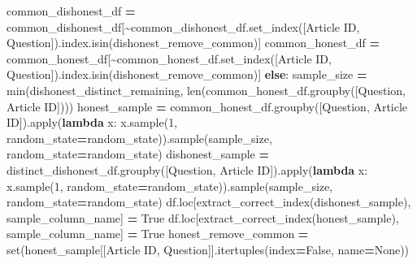 \documentclass[
]{article}
\newenvironment{Shaded}{\begin{snugshade}}{\end{snugshade}}
\newcommand{\BuiltInTok}[1]{#1}
\newcommand{\ControlFlowTok}[1]{\textcolor[rgb]{0.13,0.29,0.53}{\textbf{#1}}}
\newcommand{\DecValTok}[1]{\textcolor[rgb]{0.00,0.00,0.81}{#1}}
\newcommand{\KeywordTok}[1]{\textcolor[rgb]{0.13,0.29,0.53}{\textbf{#1}}}
\newcommand{\NormalTok}[1]{#1}
\newcommand{\OperatorTok}[1]{\textcolor[rgb]{0.81,0.36,0.00}{\textbf{#1}}}
\newcommand{\StringTok}[1]{\textcolor[rgb]{0.31,0.60,0.02}{#1}}
\newcommand{\VariableTok}[1]{\textcolor[rgb]{0.00,0.00,0.00}{#1}}
\begin{document}
\begin{Shaded}
\begin{Highlighting}[]
\NormalTok{        common\_dishonest\_df }\OperatorTok{=}\NormalTok{ common\_dishonest\_df[}\OperatorTok{\textasciitilde{}}\NormalTok{common\_dishonest\_df.set\_index([}\StringTok{\textquotesingle{}Article ID\textquotesingle{}}\NormalTok{, }\StringTok{\textquotesingle{}Question\textquotesingle{}}\NormalTok{]).index.isin(dishonest\_remove\_common)]}
\NormalTok{        common\_honest\_df }\OperatorTok{=}\NormalTok{ common\_honest\_df[}\OperatorTok{\textasciitilde{}}\NormalTok{common\_honest\_df.set\_index([}\StringTok{\textquotesingle{}Article ID\textquotesingle{}}\NormalTok{, }\StringTok{\textquotesingle{}Question\textquotesingle{}}\NormalTok{]).index.isin(dishonest\_remove\_common)]}
    \ControlFlowTok{else}\NormalTok{:}
\NormalTok{        sample\_size }\OperatorTok{=} \BuiltInTok{min}\NormalTok{(dishonest\_distinct\_remaining, }\BuiltInTok{len}\NormalTok{(common\_honest\_df.groupby([}\StringTok{\textquotesingle{}Question\textquotesingle{}}\NormalTok{, }\StringTok{\textquotesingle{}Article ID\textquotesingle{}}\NormalTok{])))}
\NormalTok{        honest\_sample }\OperatorTok{=}\NormalTok{ common\_honest\_df.groupby([}\StringTok{\textquotesingle{}Question\textquotesingle{}}\NormalTok{, }\StringTok{\textquotesingle{}Article ID\textquotesingle{}}\NormalTok{]).}\BuiltInTok{apply}\NormalTok{(}\KeywordTok{lambda}\NormalTok{ x: x.sample(}\DecValTok{1}\NormalTok{, random\_state}\OperatorTok{=}\NormalTok{random\_state)).sample(sample\_size, random\_state}\OperatorTok{=}\NormalTok{random\_state)}
\NormalTok{        dishonest\_sample }\OperatorTok{=}\NormalTok{ distinct\_dishonest\_df.groupby([}\StringTok{\textquotesingle{}Question\textquotesingle{}}\NormalTok{, }\StringTok{\textquotesingle{}Article ID\textquotesingle{}}\NormalTok{]).}\BuiltInTok{apply}\NormalTok{(}\KeywordTok{lambda}\NormalTok{ x: x.sample(}\DecValTok{1}\NormalTok{, random\_state}\OperatorTok{=}\NormalTok{random\_state)).sample(sample\_size, random\_state}\OperatorTok{=}\NormalTok{random\_state)}
\NormalTok{        df.loc[extract\_correct\_index(dishonest\_sample), sample\_column\_name] }\OperatorTok{=} \VariableTok{True}
\NormalTok{        df.loc[extract\_correct\_index(honest\_sample), sample\_column\_name] }\OperatorTok{=} \VariableTok{True}
\NormalTok{        honest\_remove\_common }\OperatorTok{=} \BuiltInTok{set}\NormalTok{(honest\_sample[[}\StringTok{\textquotesingle{}Article ID\textquotesingle{}}\NormalTok{, }\StringTok{\textquotesingle{}Question\textquotesingle{}}\NormalTok{]].itertuples(index}\OperatorTok{=}\VariableTok{False}\NormalTok{, name}\OperatorTok{=}\VariableTok{None}\NormalTok{))}

\end{Highlighting}
\end{Shaded}
\end{document}
